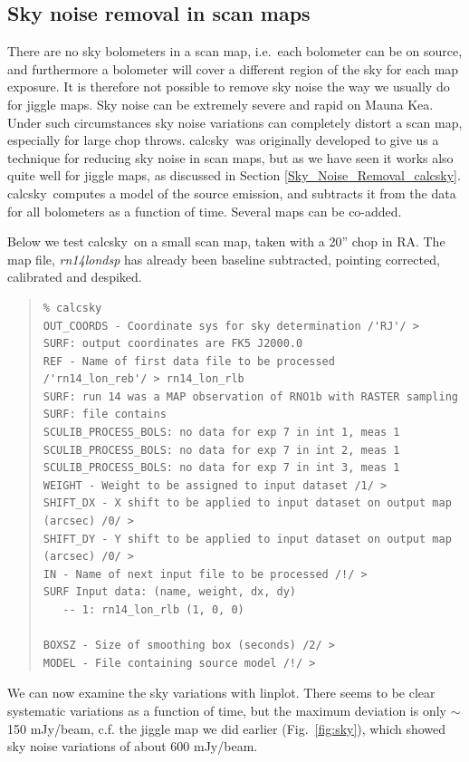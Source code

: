 \documentclass[twoside,11pt]{article}
\newenvironment{myquote}{\begin{quote}\begin{small}}{\end{small}\end{quote}}
\newcommand{\task}[1]{\textsf{#1}}
\newcommand{\calcsky}{\xref{\task{calcsky}}{sun216}{CALCSKY}}
\newcommand{\linplot}{\xref{\task{linplot}}{sun95}{LINPLOT}}
\newcommand{\xref}[3]{#1}
\newcommand{\xlabel}[1]{}
\renewcommand{\_}{\texttt{\symbol{95}}}
\begin{document}
\subsection{\xlabel{scan_maps_calcsky}Sky noise removal in scan maps
\label{scan_maps_calcsky}}

There are no sky bolometers in a scan map, i.e.\ each bolometer can be
on source, and furthermore a bolometer will cover a different region
of the sky for each map exposure.  It is therefore not possible to
remove sky noise the way we usually do for jiggle maps.  Sky noise can
be extremely severe and rapid on Mauna Kea.  Under such circumstances
sky noise variations can completely distort a scan map, especially for
large chop throws.  \calcsky\ was originally developed to give us a
technique for reducing sky noise in scan maps, but as we have seen it
works also quite well for jiggle maps, as discussed in Section
\ref{Sky_Noise_Removal_calcsky}.  \calcsky\ computes a model of the
source emission, and subtracts it from the data for all bolometers as
a function of time. Several maps can be co-added.


Below we test \calcsky\ on a small scan map, taken with a 20'' chop
in RA.  The map file, {\it rn14\_lon\_dsp} has already been baseline
subtracted, pointing corrected, calibrated and despiked.


\begin{myquote}
\begin{verbatim}
% calcsky
OUT_COORDS - Coordinate sys for sky determination /'RJ'/ > 
SURF: output coordinates are FK5 J2000.0
REF - Name of first data file to be processed 
/'rn14_lon_reb'/ > rn14_lon_rlb
SURF: run 14 was a MAP observation of RNO1b with RASTER sampling
SURF: file contains
SCULIB_PROCESS_BOLS: no data for exp 7 in int 1, meas 1
SCULIB_PROCESS_BOLS: no data for exp 7 in int 2, meas 1
SCULIB_PROCESS_BOLS: no data for exp 7 in int 3, meas 1
WEIGHT - Weight to be assigned to input dataset /1/ > 
SHIFT_DX - X shift to be applied to input dataset on output map 
(arcsec) /0/ > 
SHIFT_DY - Y shift to be applied to input dataset on output map 
(arcsec) /0/ > 
IN - Name of next input file to be processed /!/ > 
SURF Input data: (name, weight, dx, dy)
   -- 1: rn14_lon_rlb (1, 0, 0)

BOXSZ - Size of smoothing box (seconds) /2/ > 
MODEL - File containing source model /!/ > 
\end{verbatim}
\end{myquote}

We can now examine the sky variations with \linplot. There seems to be
clear systematic variations as a function of time, but the maximum
deviation is only $\sim$ 150 mJy/beam, c.f. the jiggle map we did
earlier (Fig.\ \ref{fig:sky}), which showed sky noise variations of
about 600 mJy/beam.
\end{document}
